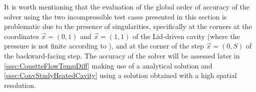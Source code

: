 It is worth mentioning that the evaluation of the global order of accuracy of the solver using the two incompressible test cases presented in this section is problematic due to the presence of singularities, specifically at the corners at the coordinates $ \vec{x} = (0,1)$ and $\vec{x} =(1,1)$ of the Lid-driven cavity (where the pressure is not finite according to \cite{botellaBenchmarkSpectralResults1998}), and at the corner of the step $\vec{x} = (0,S)$ of the backward-facing step. The accuracy of the solver will be assessed later in  \cref{ssec:CouetteFlowTempDiff} making use of a analytical solution and \cref{ssec:ConvStudyHeatedCavity} using a solution obtained with a high spatial resolution.
